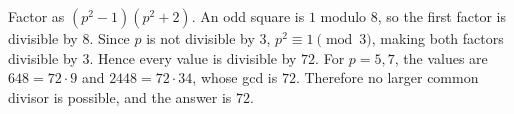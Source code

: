 Factor as $(p^2-1)(p^2+2)$. An odd square is $1$ modulo $8$, so the first factor is divisible by $8$. Since $p$ is not divisible by $3$, $p^2\equiv1\pmod3$, making both factors divisible by $3$. Hence every value is divisible by $72$. For $p=5,7$, the values are $648=72\cdot9$ and $2448=72\cdot34$, whose gcd is $72$. Therefore no larger common divisor is possible, and the answer is $\boxed{72}$.
